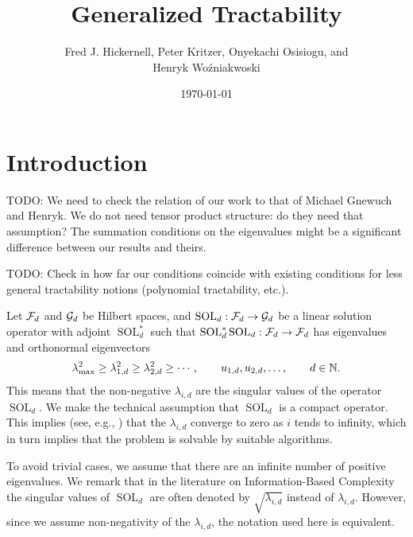 \documentclass[11pt,a4paper]{article}
\DeclareMathOperator{\SOL}{SOL}
\newcommand{\fred}[1]{\begingroup\color{blue}#1\endgroup}
\newcommand{\peter}[1]{\begingroup\color{purple}#1\endgroup}
\newcommand{\kachi}[1]{\begingroup\color{ForestGreen}#1\endgroup}
\begin{document}
\newtheorem{theorem}{Theorem}
\theoremstyle{definition}
\newtheorem{definition}{Definition}
\newtheorem{example}{Example}

\title{Generalized Tractability}
\author{\fred{Fred J. Hickernell}, \peter{Peter Kritzer}, \kachi{Onyekachi Osisiogu}, and \\ Henryk Wo\'zniakwoski}
\date{\today}

\maketitle

\section{Introduction}

TODO: We need to check the relation of our work to that of Michael Gnewuch and Henryk. We do not need tensor product structure: do they need that assumption? The summation conditions on the eigenvalues might be a significant difference between our results and theirs.

\medskip

TODO: Check in how far our conditions coincide with existing conditions for less general tractability notions (polynomial tractability, etc.).

\medskip

Let $\mathcal{F}_d$ and $\mathcal{G}_d$ be Hilbert spaces, and $\SOL_d : \cf_d \to \cg_d$ be a linear solution operator  with adjoint $\SOL_d^*$ such that $\SOL_d^*\SOL_d : \cf_d \to \cf_d$ has eigenvalues and orthonormal eigenvectors
\begin{equation} \label{eq:eigenvalues}
\lambda_{\max}^2 \ge \lambda_{1,d}^2 \ge \lambda_{2,d}^2 \ge \cdots, \qquad u_{1,d}, u_{2,d}, \ldots, \qquad d \in \mathbb{N}.
\end{equation}
This means that the non-negative $\lambda_{i,d}$ are the singular values of the \peter{operator} $\SOL_d$. 
We make the technical assumption that $\SOL_d$ is a compact operator. This implies (see, e.g., \cite{NW08}) that the $\lambda_{i,d}$ converge to zero as $i$ tends to infinity, which in turn implies that the problem is solvable by suitable algorithms. 

To avoid trivial cases, we assume that there are an infinite number of positive eigenvalues. \peter{We remark that in the literature on Information-Based Complexity the singular values of $\SOL_d$ are often denoted by $\sqrt{\lambda_{i,d}}$ instead of $\lambda_{i,d}$. However, since we assume non-negativity of the $\lambda_{i,d}$, the notation used here is equivalent.}
\end{document}
